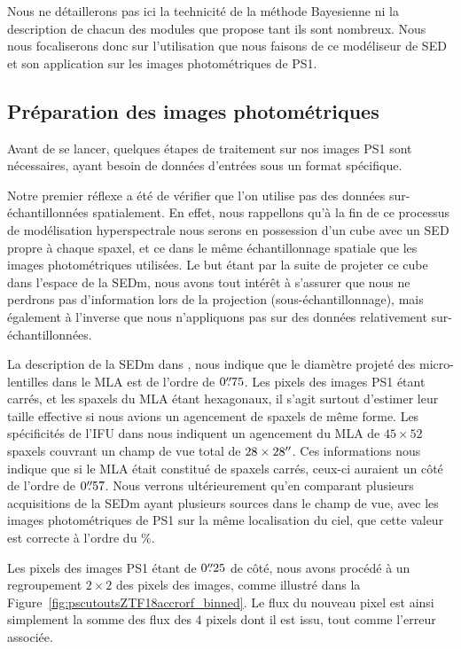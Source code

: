 \documentclass[../main/main.tex]{subfiles}
\begin{document}
Nous ne détaillerons pas ici la technicité de la méthode Bayesienne ni
la description de chacun des modules que propose  tant ils
sont nombreux. Nous nous focaliserons donc sur l'utilisation que nous faisons
de ce modéliseur de SED et son application sur les images photométriques
de PS1.

\subsection{Préparation des images photométriques}
\label{ssec:preprocessimages}

Avant de se lancer, quelques étapes de traitement sur nos images PS1
sont nécessaires,  ayant besoin de données d'entrées sous un
format spécifique.

Notre premier réflexe a été de vérifier que l'on utilise pas des données
sur-échantillonnées spatialement. En effet, nous rappellons qu'à la fin de
ce processus de modélisation hyperspectrale nous serons en possession
d'un cube avec un SED propre à chaque spaxel, et ce dans le même
échantillonnage spatiale que les images photométriques utilisées. Le but
étant par la suite de projeter ce cube dans l'espace de la SEDm, nous avons
tout intérêt à s'assurer que nous ne perdrons pas d'information lors de
la projection (sous-échantillonnage), mais également à l'inverse que
nous n'appliquons pas  sur des données relativement
sur-échantillonnées.

La description de la SEDm dans \citet{SEDM18}, nous indique que le
diamètre projeté des micro-lentilles dans le MLA est de l'ordre de
$0\overset{\prime\prime}{.}75$. Les pixels des images PS1 étant carrés, et les spaxels du MLA étant hexagonaux, il s'agit surtout
d'estimer leur taille effective si nous avions un agencement de spaxels
de même forme. Les spécificités de l'IFU dans \citet{SEDM18} nous indiquent un
agencement du MLA de $45\times52$ spaxels couvrant un champ de vue total de
$28\times28^{\prime\prime}$. Ces informations nous indique que si le MLA
était constitué de spaxels carrés, ceux-ci auraient un côté de l'ordre
de $0\overset{\prime\prime}{.}57$. Nous verrons ultérieurement qu'en
comparant plusieurs acquisitions de la SEDm ayant plusieurs sources dans
le champ de vue, avec les images photométriques de PS1 sur la même
localisation du ciel, que cette valeur est correcte à l'ordre du \%.

Les pixels des images PS1 étant de $0\overset{\prime\prime}{.}25$ de côté, nous avons
procédé à un regroupement $2\times2$ des pixels des images, comme
illustré dans la Figure~\ref{fig:pscutoutsZTF18accrorf_binned}. Le flux
du nouveau pixel est ainsi simplement la somme des flux des $4$ pixels
dont il est issu, tout comme l'erreur associée.
\end{document}
